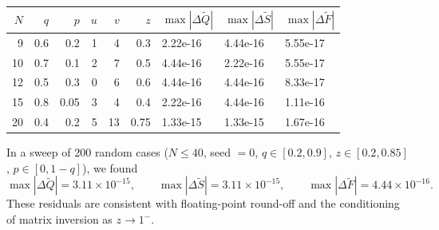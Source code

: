 \documentclass[11pt]{article}
\begin{document}
\begin{center}
\small
\begin{tabular}{r r r r r r l l l}
\hline
$N$ & $q$ & $p$ & $u$ & $v$ & $z$ & $\max|\Delta\tilde Q|$ & $\max|\Delta\tilde S|$ & $\max|\Delta\tilde F|$ \\
\hline
9 & 0.6 & 0.2 & 1 & 4 & 0.3 & 2.22e-16 & 4.44e-16 & 5.55e-17 \\
10 & 0.7 & 0.1 & 2 & 7 & 0.5 & 4.44e-16 & 2.22e-16 & 5.55e-17 \\
12 & 0.5 & 0.3 & 0 & 6 & 0.6 & 4.44e-16 & 4.44e-16 & 8.33e-17 \\
15 & 0.8 & 0.05 & 3 & 4 & 0.4 & 2.22e-16 & 4.44e-16 & 1.11e-16 \\
20 & 0.4 & 0.2 & 5 & 13 & 0.75 & 1.33e-15 & 1.33e-15 & 1.67e-16 \\
\hline
\end{tabular}
\end{center}

In a sweep of 200 random cases ($N\le 40$, seed $=0$, $q\in[0.2,0.9]$, $z\in[0.2,0.85]$, $p\in[0,1-q]$), we found
\[
\max|\Delta\tilde Q|=3.11\times 10^{-15},\qquad
\max|\Delta\tilde S|=3.11\times 10^{-15},\qquad
\max|\Delta\tilde F|=4.44\times 10^{-16}.
\]
These residuals are consistent with floating-point round-off and the conditioning of matrix inversion as $z\to 1^{-}$.
\end{document}
